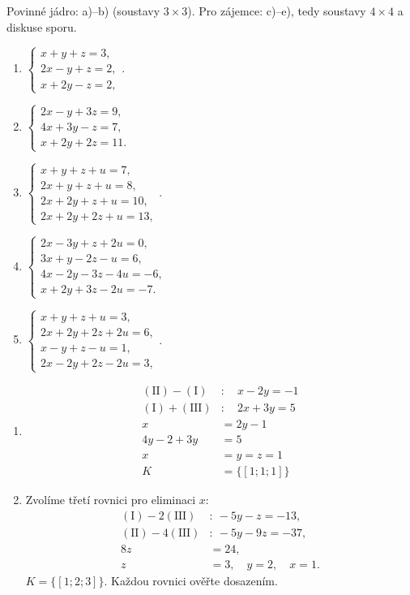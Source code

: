 \documentclass[11pt,a4paper]{article}
\begin{document}
Povinné jádro: a)--b) (soustavy $3\times3$). Pro zájemce: c)--e), tedy soustavy $4\times4$ a diskuse sporu.
\begin{zadaniReseniBox}[title={Domácí úkol}]
\begin{enumerate}[label=\alph*)]
\item $\begin{cases}x+y+z=3,\\2x-y+z=2,\\x+2y-z=2,\end{cases}$.
\item $\begin{cases}2x-y+3z=9,\\4x+3y-z=7,\\x+2y+2z=11.\end{cases}$
\item $\begin{cases}x+y+z+u=7,\\2x+y+z+u=8,\\2x+2y+z+u=10,\\2x+2y+2z+u=13,\end{cases}$.
\item $\begin{cases}2x-3y+z+2u=0,\\3x+y-2z-u=6,\\4x-2y-3z-4u=-6,\\x+2y+3z-2u=-7.\end{cases}$
\item $\begin{cases}x+y+z+u=3,\\2x+2y+2z+2u=6,\\x-y+z-u=1,\\2x-2y+2z-2u=3,\end{cases}$.
\end{enumerate}
\tcblower
\begin{enumerate}[label=\alph*)]
\item
\[\begin{aligned}
(\mathrm{II})-(\mathrm I)&:\quad x-2y=-1\\(\mathrm I)+(\mathrm{III})&:\quad 2x+3y=5\\x&=2y-1\\4y-2+3y&=5\\x&=y=z=1\\K&=\{[1;1;1]\}
\end{aligned}\]

\item
Zvolíme třetí rovnici pro eliminaci $x$:
\[\begin{aligned}
(\mathrm I)-2(\mathrm{III})&:\ -5y-z=-13,\\
(\mathrm{II})-4(\mathrm{III})&:\ -5y-9z=-37,\\
8z&=24,\\
z&=3,\quad y=2,\quad x=1.
\end{aligned}\]
$K=\{[1;2;3]\}$. Každou rovnici ověřte dosazením.


\end{enumerate}
\end{zadaniReseniBox}
\end{document}
